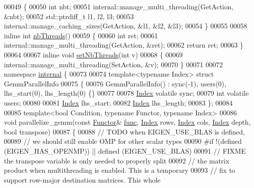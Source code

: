 \begin{DoxyCode}
00049 \{
00050   \textcolor{keywordtype}{int} nbt;
00051   internal::manage\_multi\_threading(GetAction, &nbt);
00052   std::ptrdiff\_t l1, l2, l3;
00053   internal::manage\_caching\_sizes(GetAction, &l1, &l2, &l3);
00054 \}
00055 
00058 \textcolor{keyword}{inline} \textcolor{keywordtype}{int} \hyperlink{namespace_eigen_a9aca97d83e21b91a04ec079360dfffeb}{nbThreads}()
00059 \{
00060   \textcolor{keywordtype}{int} ret;
00061   internal::manage\_multi\_threading(GetAction, &ret);
00062   \textcolor{keywordflow}{return} ret;
00063 \}
00064 
00067 \textcolor{keyword}{inline} \textcolor{keywordtype}{void} \hyperlink{namespace_eigen_af9cd17c2fe18204239cd11c88c120b50}{setNbThreads}(\textcolor{keywordtype}{int} v)
00068 \{
00069   internal::manage\_multi\_threading(SetAction, &v);
00070 \}
00071 
00072 \textcolor{keyword}{namespace }\hyperlink{namespaceinternal}{internal} \{
00073 
00074 \textcolor{keyword}{template}<\textcolor{keyword}{typename} Index> \textcolor{keyword}{struct }GemmParallelInfo
00075 \{
00076   GemmParallelInfo() : sync(-1), users(0), lhs\_start(0), lhs\_length(0) \{\}
00077 
00078   \hyperlink{namespace_eigen_a62e77e0933482dafde8fe197d9a2cfde}{Index} \textcolor{keyword}{volatile} sync;
00079   \textcolor{keywordtype}{int} \textcolor{keyword}{volatile} users;
00080 
00081   \hyperlink{namespace_eigen_a62e77e0933482dafde8fe197d9a2cfde}{Index} lhs\_start;
00082   \hyperlink{namespace_eigen_a62e77e0933482dafde8fe197d9a2cfde}{Index} lhs\_length;
00083 \};
00084 
00085 \textcolor{keyword}{template}<\textcolor{keywordtype}{bool} Condition, \textcolor{keyword}{typename} Functor, \textcolor{keyword}{typename} Index>
00086 \textcolor{keywordtype}{void} parallelize\_gemm(\textcolor{keyword}{const} \hyperlink{struct_functor}{Functor}& \hyperlink{structfunc}{func}, \hyperlink{namespace_eigen_a62e77e0933482dafde8fe197d9a2cfde}{Index} rows, \hyperlink{namespace_eigen_a62e77e0933482dafde8fe197d9a2cfde}{Index} cols, 
      \hyperlink{namespace_eigen_a62e77e0933482dafde8fe197d9a2cfde}{Index} depth, \textcolor{keywordtype}{bool} transpose)
00087 \{
00088   \textcolor{comment}{// TODO when EIGEN\_USE\_BLAS is defined,}
00089   \textcolor{comment}{// we should still enable OMP for other scalar types}
00090 \textcolor{preprocessor}{#if !(defined (EIGEN\_HAS\_OPENMP)) || defined (EIGEN\_USE\_BLAS)}
00091   \textcolor{comment}{// FIXME the transpose variable is only needed to properly split}
00092   \textcolor{comment}{// the matrix product when multithreading is enabled. This is a temporary}
00093   \textcolor{comment}{// fix to support row-major destination matrices. This whole}

\end{DoxyCode}

